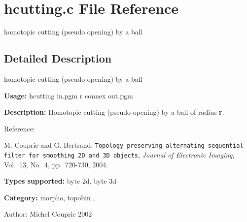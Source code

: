 \section{hcutting.c File Reference}
\label{hcutting_8c}
homotopic cutting (pseudo opening) by a ball  




\label{_details}
\subsection{Detailed Description}
homotopic cutting (pseudo opening) by a ball 

{\bf Usage:} hcutting in.pgm r connex out.pgm

{\bf Description:} Homotopic cutting (pseudo opening) by a ball of radius {\bf r}.

Reference:\par
 [CB04] M. Couprie and G. Bertrand: {\tt Topology preserving alternating sequential filter for smoothing 2D and 3D objects}, {\em  Journal of Electronic Imaging\/}, Vol.~13, No.~4, pp.~720-730, 2004.

{\bf Types supported:} byte 2d, byte 3d

{\bf Category:} morpho, topobin ,

\begin{Desc}
\item[Author:]Michel Couprie 2002 \end{Desc}
